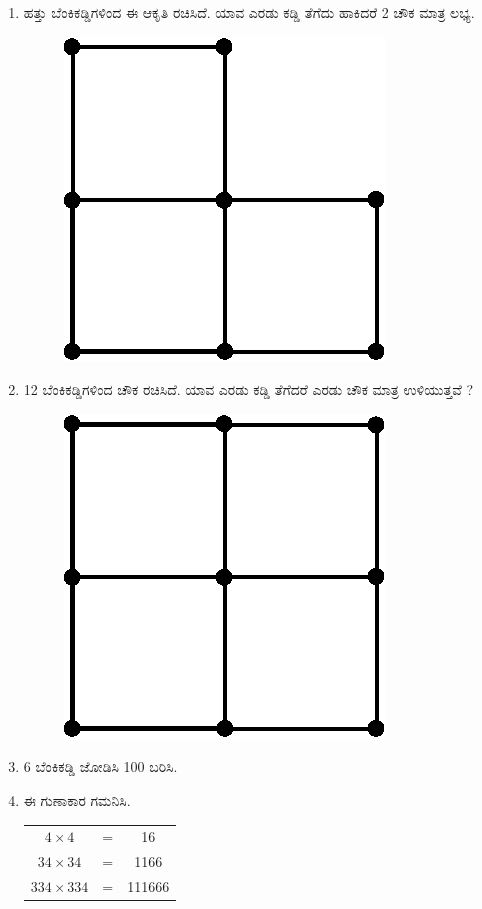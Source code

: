 \begin{enumerate}
\item ಹತ್ತು ಬೆಂಕಿಕಡ್ಡಿಗಳಿಂದ ಈ ಆಕೃತಿ ರಚಿಸಿದೆ. ಯಾವ ಎರಡು ಕಡ್ಡಿ ತೆಗೆದು ಹಾಕಿದರೆ 2 ಚೌಕ ಮಾತ್ರ ಲಭ್ಯ.
\begin{figure}[!ht]
\centering
\includegraphics[scale=.85]{images/chap1/fig1.eps}
\end{figure}

\item 12 ಬೆಂಕಿಕಡ್ಡಿಗಳಿಂದ ಚೌಕ ರಚಿಸಿದೆ. ಯಾವ ಎರಡು ಕಡ್ಡಿ ತೆಗೆದರೆ ಎರಡು ಚೌಕ ಮಾತ್ರ ಉಳಿಯುತ್ತವೆ ?
\begin{figure}[!h]
\centering
\includegraphics[scale=.85]{images/chap1/fig2.eps}
\end{figure}

\item 6 ಬೆಂಕಿಕಡ್ಡಿ ಜೋಡಿಸಿ 100 ಬರಿಸಿ.

\item ಈ ಗುಣಾಕಾರ ಗಮನಿಸಿ.
\begin{center}
\begin{tabular}{ccc}
$4\times 4$ & = & 16\\
$34\times 34$ & = & 1166\\
$334\times 334$ & = & 111666
\end{tabular}
\end{center}


\end{enumerate}
